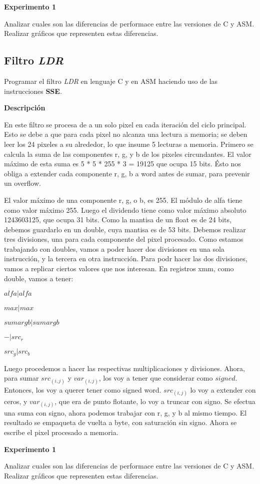 \vspace*{0.3cm} \noindent
\textbf{Experimento 1}

  Analizar cuales son las diferencias de performace entre las versiones de C y ASM. 
  Realizar gráficos que representen estas diferencias.



\subsection*{Filtro \textit{LDR}}
  Programar el filtro \textit{LDR} en lenguaje C y en
  ASM haciendo uso de las instrucciones \textbf{SSE}.

\vspace*{0.3cm} \noindent
\textbf{Descripción}

En este filtro se procesa de a un solo pixel en cada iteración del ciclo principal. Esto se debe a que para cada pixel no alcanza una lectura a
memoria; se deben leer los 24 pixeles a su alrededor, lo que insume 5 lecturas a memoria.
Primero se calcula la suma de las componentes r, g, y b de los pixeles circundantes. El valor máximo de esta suma es 5 * 5 * 255 * 3 = 19125 que 
ocupa 15 bits. Ésto nos obliga a extender cada componente r, g, b a word antes de sumar, para prevenir un overflow.

El valor máximo de una componente r, g, o b, es 255. El módulo de alfa tiene como valor máximo 255. Luego el dividendo tiene como valor máximo
absoluto 1243603125, que ocupa 31 bits. Como la mantisa de un float es de 24 bits, debemos guardarlo en un double, cuya mantisa es de 53 bits.
Debemos realizar tres divisiones, una para cada componente del pixel procesado. Como estamos trabajando con doubles, vamos a poder hacer dos
divisiones en una sola instrucción, y la tercera en otra instrucción. Para podr hacer las dos divisiones, vamos a replicar ciertos valores 
que nos interesan. 
En registros xmm, como double, vamos a tener:

$alfa | alfa$

$max | max$

$sumargb | sumargb$

$- | src_r$

$src_g | src_b$

Luego procedemos a hacer las respectivas multiplicaciones y divisiones. Ahora, para sumar $src_{(i,j)}$ y $var_{(i,j)}$, los voy a tener que
considerar como $signed$. Entonces, los voy a querer tener como signed word. $src_{(i,j)}$ lo voy a extender con ceros, y $var_{(i,j)}$, que era
de punto flotante, lo voy a truncar con signo. Se efectua una suma con signo, ahora podemos trabajar con r, g, y b al mismo tiempo. El resultado
se empaqueta de vuelta a byte, con saturación sin signo. Ahora se escribe el pixel procesado a memoria.

\vspace*{0.3cm} \noindent
\textbf{Experimento 1}

  Analizar cuales son las diferencias de performace entre las versiones de C y ASM. 
  Realizar gráficos que representen estas diferencias.

